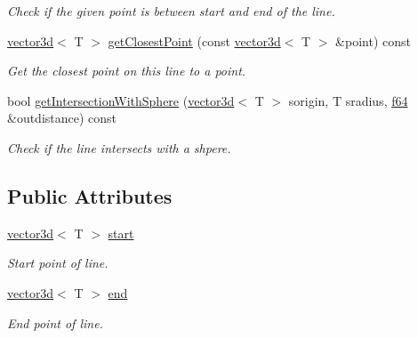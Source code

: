 \begin{DoxyCompactItemize}
\begin{DoxyCompactList}\small\item\em Check if the given point is between start and end of the line. \end{DoxyCompactList}\item 
\hyperlink{classirr_1_1core_1_1vector3d}{vector3d}$<$ T $>$ \hyperlink{classirr_1_1core_1_1line3d_afae16456838c8e8f88f71fe1480967e8}{get\+Closest\+Point} (const \hyperlink{classirr_1_1core_1_1vector3d}{vector3d}$<$ T $>$ \&point) const 
\begin{DoxyCompactList}\small\item\em Get the closest point on this line to a point. \end{DoxyCompactList}\item 
bool \hyperlink{classirr_1_1core_1_1line3d_aaa4419864f37980fc38ae6b618bb0133}{get\+Intersection\+With\+Sphere} (\hyperlink{classirr_1_1core_1_1vector3d}{vector3d}$<$ T $>$ sorigin, T sradius, \hyperlink{namespaceirr_a1325b02603ad449f92c68fc640af9b28}{f64} \&outdistance) const 
\begin{DoxyCompactList}\small\item\em Check if the line intersects with a shpere. \end{DoxyCompactList}\end{DoxyCompactItemize}
\subsection*{Public Attributes}
\begin{DoxyCompactItemize}
\item 
\hyperlink{classirr_1_1core_1_1vector3d}{vector3d}$<$ T $>$ \hyperlink{classirr_1_1core_1_1line3d_a8874f77324b6ef6632e66b22051a3251}{start}\hypertarget{classirr_1_1core_1_1line3d_a8874f77324b6ef6632e66b22051a3251}{}\label{classirr_1_1core_1_1line3d_a8874f77324b6ef6632e66b22051a3251}

\begin{DoxyCompactList}\small\item\em Start point of line. \end{DoxyCompactList}\item 
\hyperlink{classirr_1_1core_1_1vector3d}{vector3d}$<$ T $>$ \hyperlink{classirr_1_1core_1_1line3d_aea19cb33971bb20e1d736facdae8a8f0}{end}\hypertarget{classirr_1_1core_1_1line3d_aea19cb33971bb20e1d736facdae8a8f0}{}\label{classirr_1_1core_1_1line3d_aea19cb33971bb20e1d736facdae8a8f0}

\begin{DoxyCompactList}\small\item\em End point of line. \end{DoxyCompactList}\end{DoxyCompactItemize}


